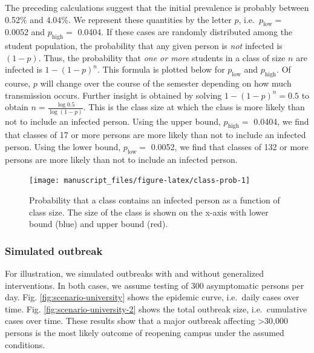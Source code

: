 \documentclass[
]{article}
\begin{document}
The preceding calculations suggest that the initial prevalence is
probably between 0.52\% and 4.04\%. We represent these quantities by the
letter \(p\), i.e.~\(p_{\text{low}} =\) 0.0052 and \(p_{\text{high}} =\)
0.0404. If these cases are randomly distributed among the student
population, the probability that any given person is \emph{not} infected
is \((1-p)\). Thus, the probability that \emph{one or more} students in
a class of size \(n\) are infected is \(1-(1-p)^n\). This formula is
plotted below for \(p_{\text{low}}\) and \(p_{\text{high}}\). Of course,
\(p\) will change over the course of the semester depending on how much
transmission occurs. Further insight is obtained by solving
\(1-(1-p)^n=0.5\) to obtain \(n=\frac{\log 0.5}{\log (1-p)}\). This is
the class size at which the class is more likely than not to include an
infected person. Using the upper bound, \(p_{\text{high}} =\) 0.0404, we
find that classes of 17 or more persons are more likely than not to
include an infected person. Using the lower bound, \(p_{\text{low}} =\)
0.0052, we find that classes of 132 or more persons are more likely than
not to include an infected person.

\begin{figure}

{\centering \texttt{[image: manuscript\_files/figure-latex/class-prob-1]} 

}

\caption{\label{fig:class-size}Probability that a class contains an infected person as a function of class size. The size of the class is shown on the x-axis with lower bound (blue) and upper bound (red).}\label{fig:class-prob}
\end{figure}

\hypertarget{simulated-outbreak}{%
\subsubsection{Simulated outbreak}\label{simulated-outbreak}}

For illustration, we simulated outbreaks with and without generalized
interventions. In both cases, we assume testing of 300 asymptomatic
persons per day. Fig. \ref{fig:scenario-university} shows the epidemic
curve, i.e.~daily cases over time. Fig. \ref{fig:scenario-university-2}
shows the total outbreak size, i.e.~cumulative cases over time. These
results show that a major outbreak affecting \textgreater30,000 persons
is the most likely outcome of reopening campus under the assumed
conditions.
\end{document}
